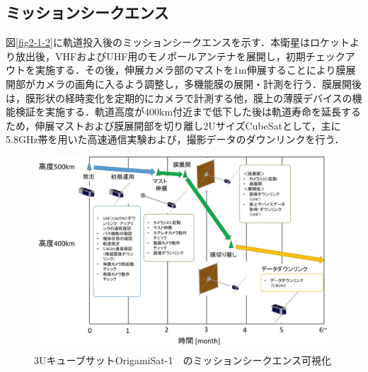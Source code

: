 \subsection{ミッションシークエンス}
図\ref{fig2-1-2}に軌道投入後のミッションシークエンスを示す．本衛星はロケットより放出後，VHFおよびUHF用のモノポールアンテナを展開し，初期チェックアウトを実施する．その後，伸展カメラ部のマストを1m伸展することにより膜展開部がカメラの画角に入るよう調整し，多機能膜の展開・計測を行う．膜展開後は，膜形状の経時変化を定期的にカメラで計測する他，膜上の薄膜デバイスの機能検証を実施する．軌道高度が400km付近まで低下した後は軌道寿命を延長するため，伸展マストおよび膜展開部を切り離し2UサイズCubeSatとして，主に5.8GHz帯を用いた高速通信実験および，撮影データのダウンリンクを行う．
\begin{figure}[H]
	\centering
	\includegraphics[width=\textwidth]{02/fig/2-1-2.jpg}
	\caption{3UキューブサットOrigamiSat-1　のミッションシークエンス可視化}
	\label{2-1-2}
\end{figure}
